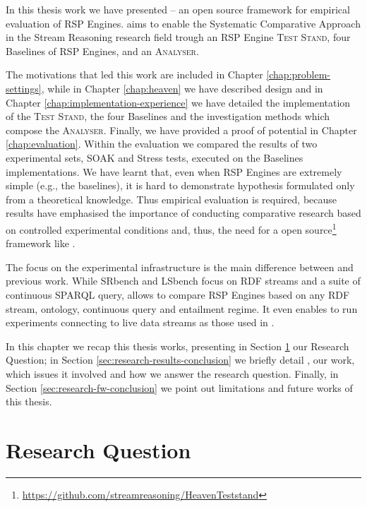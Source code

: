 In this thesis work we have presented \name -- an open source framework for empirical evaluation of RSP Engines. \name aims to enable the Systematic Comparative Approach in the Stream Reasoning research field trough an RSP Engine \textsc{Test Stand}, four Baselines of RSP Engines, and an \textsc{Analyser}. 

The motivations that led this work are included in Chapter \ref{chap:problem-settings}, while in Chapter \ref{chap:heaven} we have described \name design and in Chapter \ref{chap:implementation-experience} we have detailed the implementation of the \textsc{Test Stand}, the four Baselines and the investigation methods which compose the \textsc{Analyser}. Finally, we have provided a proof of \name potential in Chapter \ref{chap:evaluation}. Within the evaluation we compared the results of two experimental sets, SOAK and Stress tests, executed on the Baselines implementations. We have learnt that, even when RSP Engines are extremely simple (e.g., the baselines), it is hard to demonstrate hypothesis formulated only from a theoretical knowledge. Thus empirical evaluation is required, because results have emphasised the importance of conducting comparative research based on controlled experimental conditions and, thus, the need for a open source\footnote{\url{https://github.com/streamreasoning/HeavenTeststand}} framework like \namens.

The focus on the experimental infrastructure is the main difference between \name and previous work. While SRbench and LSbench focus on RDF streams and a suite of continuous SPARQL query, \name allows to compare RSP Engines based on any RDF stream, ontology, continuous query and entailment regime. It even enables to run experiments connecting to live data streams as those used in \cite{DBLP:conf/semweb/BalduiniVDTPC13}.	

In this chapter we recap this thesis works, presenting in Section \ref{sec:research-question-conclusion} our Research Question; in Section \ref{sec:research-results-conclusion} we briefly detail \namens, our work, which issues it involved and how we answer the research question. Finally, in Section \ref{sec:research-fw-conclusion} we point out \name limitations and future works of this thesis.

\section{Research Question}\label{sec:research-question-conclusion}

